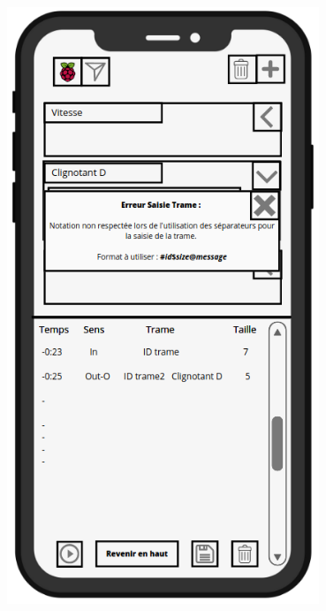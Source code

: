 \begin{minipage}{0.5\linewidth}
    \centering
    \includegraphics[width=0.7\textwidth]{sections/3_Exigences_specifiques/1_IHM/ihm/ecranErreurTrame.png}
    \captionsetup{justification=centering}
    \label{ecran_principal_popup_erreur_saisie_trame}
\end{minipage}\hfill
